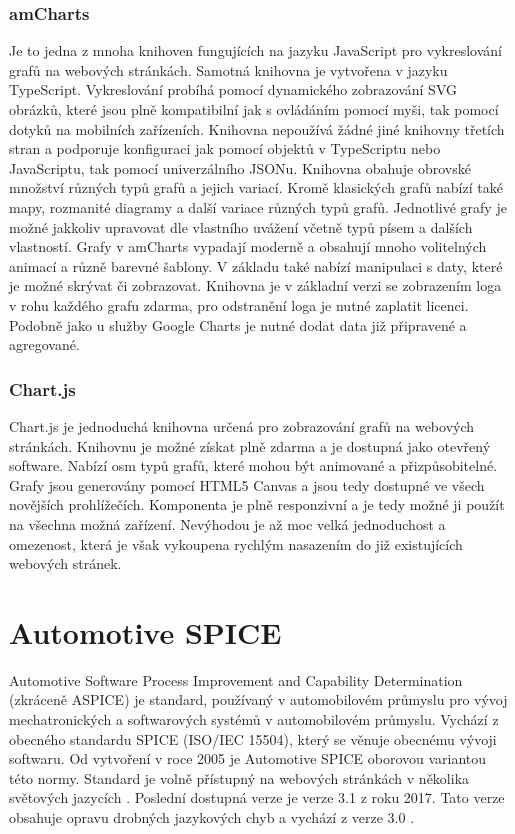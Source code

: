 \documentclass[czech,master,public,dept460,male,cpdeclaration,oneside]{diploma}
\begin{document}
\subsubsection{amCharts}
\label{sec:amcharts}
Je to jedna z mnoha knihoven fungujících na jazyku JavaScript pro vykreslování grafů na webových stránkách. Samotná knihovna je vytvořena v jazyku TypeScript. Vykreslování probíhá pomocí dynamického zobrazování SVG obrázků, které jsou plně kompatibilní jak s ovládáním pomocí myši, tak pomocí dotyků na mobilních zařízeních. Knihovna nepoužívá žádné jiné knihovny třetích stran a podporuje konfiguraci jak pomocí objektů v TypeScriptu nebo JavaScriptu, tak pomocí univerzálního JSONu. Knihovna obahuje obrovské množství různých typů grafů a jejich variací. Kromě klasických grafů nabízí také mapy, rozmanité diagramy a další variace různých typů grafů. Jednotlivé grafy je možné jakkoliv upravovat dle vlastního uvážení včetně typů písem a dalších vlastností. Grafy v amCharts vypadají moderně a obsahují mnoho volitelných animací a různě barevné šablony.  V základu také nabízí manipulaci s daty, které je možné skrývat či zobrazovat. Knihovna je v základní verzi se zobrazením loga v rohu každého grafu zdarma, pro odstranění loga je nutné zaplatit licenci. Podobně jako u služby Google Charts je nutné dodat data již připravené a agregované. \cite{ref:amcharts_web}

\subsubsection{Chart.js}
Chart.js je jednoduchá knihovna určená pro zobrazování grafů na webových stránkách. Knihovnu je možné získat plně zdarma a je dostupná jako otevřený software. Nabízí osm typů grafů, které mohou být animované a přizpůsobitelné. Grafy jsou generovány pomocí HTML5 Canvas a jsou tedy dostupné ve všech novějších prohlížečích. Komponenta je plně responzivní a je tedy možné ji použít na všechna možná zařízení. Nevýhodou je až moc velká jednoduchost a omezenost, která je však vykoupena rychlým nasazením do již existujících webových stránek. \cite{ref:chartjs}



\section{Automotive SPICE}
\label{sec:aspice}
Automotive Software Process Improvement and Capability Determination (zkráceně ASPICE) je standard, používaný v automobilovém průmyslu pro vývoj mechatronických a softwarových systémů v automobilovém průmyslu. Vychází z obecného standardu SPICE (ISO/IEC 15504), který se věnuje obecnému vývoji softwaru. Od vytvoření v roce 2005 je Automotive SPICE oborovou variantou této normy. Standard je volně přístupný na webových stránkách v několika světových jazycích \cite{ref:aspice_download_obecne}. Poslední dostupná verze je verze 3.1 z roku 2017. Tato verze obsahuje opravu drobných jazykových chyb a vychází z verze 3.0 \cite{ref:aspice_download_verze}.
\end{document}
